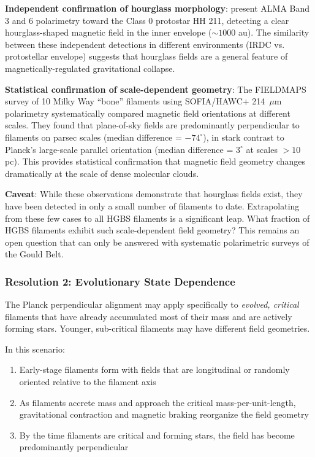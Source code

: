 \documentclass[11pt,a4paper]{article}
\begin{document}
\textbf{Independent confirmation of hourglass morphology}: \citet{Choi2025} present ALMA Band 3 and 6 polarimetry toward the Class 0 protostar HH 211, detecting a clear hourglass-shaped magnetic field in the inner envelope ($\sim1000$ au). The similarity between these independent detections in different environments (IRDC vs. protostellar envelope) suggests that hourglass fields are a general feature of magnetically-regulated gravitational collapse.

\textbf{Statistical confirmation of scale-dependent geometry}: The FIELDMAPS survey of 10 Milky Way ``bone'' filaments \citep{Coude2025} using SOFIA/HAWC+ 214~$\mu$m polarimetry systematically compared magnetic field orientations at different scales. They found that plane-of-sky fields are predominantly perpendicular to filaments on parsec scales (median difference = $-74^{\circ}$), in stark contrast to Planck's large-scale parallel orientation (median difference = $3^{\circ}$ at scales $>10$ pc). This provides statistical confirmation that magnetic field geometry changes dramatically at the scale of dense molecular clouds.

\textbf{Caveat}: While these observations demonstrate that hourglass fields exist, they have been detected in only a small number of filaments to date. Extrapolating from these few cases to all HGBS filaments is a significant leap. What fraction of HGBS filaments exhibit such scale-dependent field geometry? This remains an open question that can only be answered with systematic polarimetric surveys of the Gould Belt.

\subsubsection{Resolution 2: Evolutionary State Dependence}

The Planck perpendicular alignment may apply specifically to \emph{evolved, critical} filaments that have already accumulated most of their mass and are actively forming stars. Younger, sub-critical filaments may have different field geometries.

In this scenario:
\begin{enumerate}
    \item Early-stage filaments form with fields that are longitudinal or randomly oriented relative to the filament axis
    \item As filaments accrete mass and approach the critical mass-per-unit-length, gravitational contraction and magnetic braking reorganize the field geometry
    \item By the time filaments are critical and forming stars, the field has become predominantly perpendicular
\end{enumerate}
\end{document}
